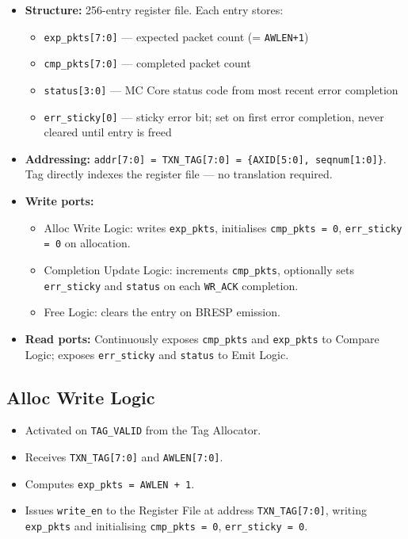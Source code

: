 \begin{itemize}
  \item \textbf{Structure:} 256-entry register file. Each entry stores:
  \begin{itemize}
    \item \texttt{exp\_pkts[7:0]} — expected packet count (= \texttt{AWLEN+1})
    \item \texttt{cmp\_pkts[7:0]} — completed packet count
    \item \texttt{status[3:0]} — MC Core status code from most recent
          error completion
    \item \texttt{err\_sticky[0]} — sticky error bit; set on first
          error completion, never cleared until entry is freed
  \end{itemize}
  \item \textbf{Addressing:} \texttt{addr[7:0] = TXN\_TAG[7:0] =
        \{AXID[5:0], seqnum[1:0]\}}. Tag directly indexes the register
        file — no translation required.
  \item \textbf{Write ports:}
  \begin{itemize}
    \item Alloc Write Logic: writes \texttt{exp\_pkts}, initialises
          \texttt{cmp\_pkts = 0}, \texttt{err\_sticky = 0} on
          allocation.
    \item Completion Update Logic: increments \texttt{cmp\_pkts},
          optionally sets \texttt{err\_sticky} and \texttt{status} on
          each \texttt{WR\_ACK} completion.
    \item Free Logic: clears the entry on BRESP emission.
  \end{itemize}
  \item \textbf{Read ports:} Continuously exposes \texttt{cmp\_pkts}
        and \texttt{exp\_pkts} to Compare Logic; exposes
        \texttt{err\_sticky} and \texttt{status} to Emit Logic.
\end{itemize}

\subsection{Alloc Write Logic}

\begin{itemize}
  \item Activated on \texttt{TAG\_VALID} from the Tag Allocator.
  \item Receives \texttt{TXN\_TAG[7:0]} and \texttt{AWLEN[7:0]}.
  \item Computes \texttt{exp\_pkts = AWLEN + 1}.
  \item Issues \texttt{write\_en} to the Register File at address
        \texttt{TXN\_TAG[7:0]}, writing \texttt{exp\_pkts} and
        initialising \texttt{cmp\_pkts = 0}, \texttt{err\_sticky = 0}.
\end{itemize}

